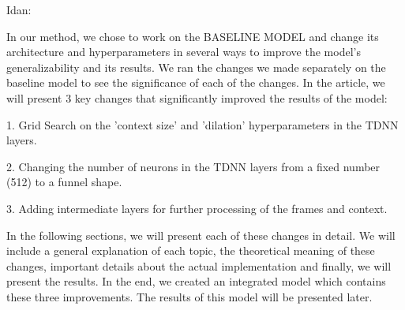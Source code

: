 \documentclass[a4paper]{article}
\begin{document}
Idan:

In our method, we chose to work on the BASELINE MODEL and change its architecture and hyperparameters in several ways to improve the model's generalizability and its results. We ran the changes we made separately on the baseline model to see the significance of each of the changes. In the article, we will present 3 key changes that significantly improved the results of the model: 

1. Grid Search on the 'context size' and 'dilation' hyperparameters in the TDNN layers. 

2. Changing the number of neurons in the TDNN layers from a fixed number (512) to a funnel shape. 

3. Adding intermediate layers for further processing of the frames and context.

In the following sections, we will present each of these changes in detail. We will include a general explanation of each topic, the theoretical meaning of these changes, important details about the actual implementation and finally, we will present the results. In the end, we created an integrated model which contains these three improvements. The results of this model will be presented later.








\end{document}
